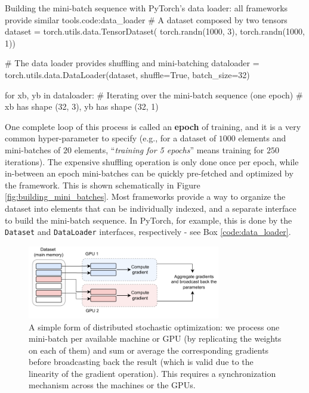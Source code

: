 \begin{mypy}{Building the mini-batch sequence with PyTorch's data loader: all frameworks provide similar tools.}{code:data_loader}
# A dataset composed by two tensors
dataset = torch.utils.data.TensorDataset(
    torch.randn(1000, 3), torch.randn(1000, 1))

# The data loader provides shuffling and mini-batching
dataloader = torch.utils.data.DataLoader(dataset, 
                shuffle=True, batch_size=32)

for xb, yb in dataloader:
  # Iterating over the mini-batch sequence (one epoch)
  # xb has shape (32, 3), yb has shape (32, 1)
\end{mypy}

One complete loop of this process is called an \textbf{epoch} of training, and it is a very common hyper-parameter to specify (e.g., for a dataset of $1000$ elements and mini-batches of $20$ elements, “\textit{training for 5 epochs}” means training for $250$ iterations). The expensive shuffling operation is only done once per epoch, while in-between an epoch mini-batches can be quickly pre-fetched and optimized by the framework. This is shown schematically in Figure \ref{fig:building_mini_batches}. Most frameworks provide a way to organize the dataset into elements that can be individually  indexed, and a separate interface to build the mini-batch sequence. In PyTorch, for example, this is done by the {\footnotesize\texttt{Dataset}} and {\footnotesize\texttt{DataLoader}} interfaces, respectively - see Box \ref{code:data_loader}.


\begin{figure}[t]
    \centering
    \includegraphics[width=0.75\textwidth]{images/mini_batch.pdf}
    \caption{A simple form of distributed stochastic optimization: we process one mini-batch per available machine or GPU (by replicating the weights on each of them) and sum or average
    the corresponding gradients before broadcasting back the result (which is valid due to the linearity of the gradient operation). This requires a synchronization mechanism across the machines or the GPUs.}
    \label{fig:mini_batch}
\end{figure}

